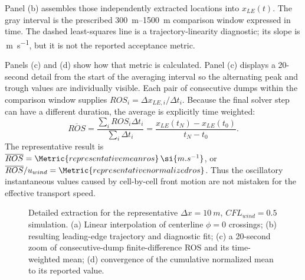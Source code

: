 Panel (b) assembles those independently extracted locations into
$x_{LE}(t)$.  The gray interval is the prescribed \SIrange{300}{1500}{m}
comparison window expressed in time.  The dashed least-squares line is a
trajectory-linearity diagnostic; its slope is
\,\si{m.s^{-1}}, but it is not the reported
acceptance metric.

Panels (c) and (d) show how that metric is calculated.  Panel (c) displays
a 20-second detail from the start of the averaging interval so the alternating
peak and trough values are individually visible.  Each pair of consecutive
dumps within the comparison window supplies
$ROS_i=\Delta x_{LE,i}/\Delta t_i$.  Because the final solver step can have a
different duration, the average is explicitly time weighted:
\begin{equation}
 \overline{ROS}
 =\frac{\sum_i ROS_i\Delta t_i}{\sum_i\Delta t_i}
 =\frac{x_{LE}(t_N)-x_{LE}(t_0)}{t_N-t_0}.
\end{equation}
The representative result is
$\overline{ROS}=\Metric{representativemeanros}\,\si{m.s^{-1}}$, or
$\overline{ROS}/u_{wind}=\Metric{representativenormalizedros}$.  Thus the
oscillatory instantaneous values caused by cell-by-cell front motion are not
mistaken for the effective transport speed.

\begin{figure}[H]
  \centering
  \caption{Detailed extraction for the representative $\Delta x=\SI{10}{m}$,
  $CFL_{wind}=0.5$ simulation.  (a) Linear interpolation of centerline
  $\phi=0$ crossings; (b) resulting leading-edge trajectory and diagnostic
  fit; (c) a 20-second zoom of consecutive-dump finite-difference ROS and
  its time-weighted mean; (d) convergence of the cumulative normalized mean
  to its reported value.}
  \label{fig:front-extraction}
\end{figure}

